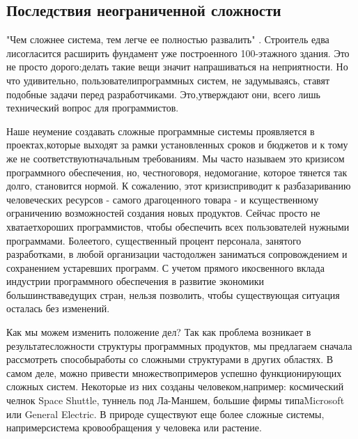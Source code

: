 \documentclass[10pt]{article}
\begin{document}
\subsection{Последствия неограниченной сложности}
"Чем сложнее система, тем легче ее полностью развалить" \cite{ The Peter Pyramid}. Строитель едва ли\linebreak согласится расширить фундамент уже построенного 100-этажного здания. Это не просто дорого:\linebreak делать такие вещи значит напрашиваться на неприятности. Но что удивительно, пользователи\linebreak программных систем, не задумываясь, ставят подобные задачи перед разработчиками. Это,\linebreak утверждают они, всего лишь технический вопрос для программистов. 

Наше неумение создавать сложные программные системы проявляется в проектах,\linebreak которые выходят за рамки установленных сроков и бюджетов и к тому же не соответствуют\linebreak начальным требованиям. Мы часто называем это кризисом программного обеспечения, но, честно\linebreak говоря, недомогание, которое тянется так долго, становится нормой. К сожалению, этот кризис\linebreak приводит к разбазариванию человеческих ресурсов - самого драгоценного товара - и к\linebreak существенному ограничению возможностей создания новых продуктов. Сейчас просто не хватает\linebreak хороших программистов, чтобы обеспечить всех пользователей нужными программами. Более\linebreak того, существенный процент персонала, занятого разработками, в любой организации часто\linebreak должен заниматься сопровождением и сохранением устаревших программ. С учетом прямого и\linebreak косвенного вклада индустрии программного обеспечения в развитие экономики большинства\linebreak ведущих стран, нельзя позволить, чтобы существующая ситуация осталась без изменений. 

Как мы можем изменить положение дел? Так как проблема возникает в результате\linebreak сложности структуры программных продуктов, мы предлагаем сначала рассмотреть способы\linebreak работы со сложными структурами в других областях. В самом деле, можно привести множество\linebreak примеров успешно функционирующих сложных систем. Некоторые из них созданы человеком,\linebreak например: космический челнок Space Shuttle, туннель под Ла-Маншем, большие фирмы типа\linebreak Microsoft или General Electric. В природе существуют еще более сложные системы, например\linebreak система кровообращения у человека или растение. 
\end{document}
